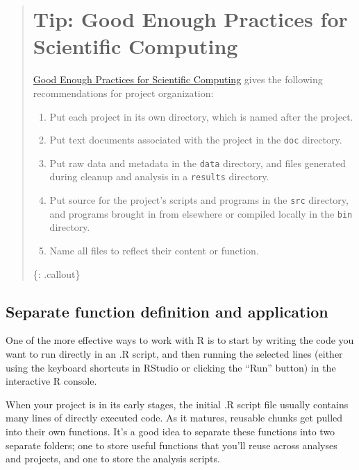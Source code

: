 \documentclass[]{book}
\providecommand{\tightlist}{%
  \setlength{\itemsep}{0pt}\setlength{\parskip}{0pt}}
\begin{document}
\begin{quote}
\section{Tip: Good Enough Practices for Scientific
Computing}\label{tip-good-enough-practices-for-scientific-computing}

\href{https://github.com/swcarpentry/good-enough-practices-in-scientific-computing/blob/gh-pages/good-enough-practices-for-scientific-computing.pdf}{Good
Enough Practices for Scientific Computing} gives the following
recommendations for project organization:

\begin{enumerate}
\def\labelenumi{\arabic{enumi}.}
\tightlist
\item
  Put each project in its own directory, which is named after the
  project.
\item
  Put text documents associated with the project in the \texttt{doc}
  directory.
\item
  Put raw data and metadata in the \texttt{data} directory, and files
  generated during cleanup and analysis in a \texttt{results} directory.
\item
  Put source for the project's scripts and programs in the \texttt{src}
  directory, and programs brought in from elsewhere or compiled locally
  in the \texttt{bin} directory.
\item
  Name all files to reflect their content or function.
\end{enumerate}

\{: .callout\}
\end{quote}

\subsection{Separate function definition and
application}\label{separate-function-definition-and-application}

One of the more effective ways to work with R is to start by writing the
code you want to run directly in an .R script, and then running the
selected lines (either using the keyboard shortcuts in RStudio or
clicking the ``Run'' button) in the interactive R console.

When your project is in its early stages, the initial .R script file
usually contains many lines of directly executed code. As it matures,
reusable chunks get pulled into their own functions. It's a good idea to
separate these functions into two separate folders; one to store useful
functions that you'll reuse across analyses and projects, and one to
store the analysis scripts.
\end{document}
